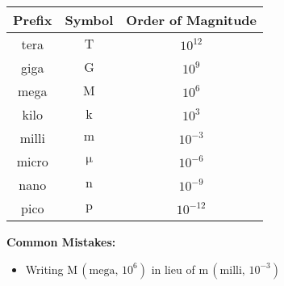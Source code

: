 \begin{enumerate}
{	\begin{center}
		\begin{tabular}{|c|c|c|}
			\hline
			Prefix & Symbol & Order of Magnitude\\\hline
			tera & $\si{\tera}$ & $10^{12}$\\\hline
			giga & $\si{\giga}$ & $10^{9}$\\\hline
			mega & $\si{\mega}$ & $10^{6}$\\\hline
			kilo & $\si{\kilo}$ & $10^{3}$\\\hline
			milli & $\si{\milli}$ & $10^{-3}$\\\hline
			micro & $\si{\micro}$ & $10^{-6}$\\\hline
			nano & $\si{\nano}$ & $10^{-9}$\\\hline
			pico & $\si{\pico}$ & $10^{-12}$\\\hline
		\end{tabular}
	\end{center}
	\textbf{Common Mistakes:}
	\begin{itemize}
		\item Writing $\si{\mega}\, (\text{mega, }10^6)$ in lieu of $\si{\milli}\, (\text{milli, }10^{-3})$
	\end{itemize}

}




\end{enumerate}
